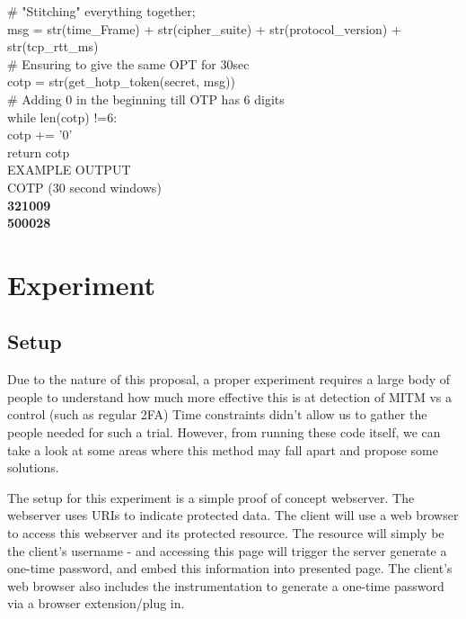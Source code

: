 \documentclass[a4paper, 11pt]{article} 				%
\begin{document}
\# "Stitching" everything together;\\
\indent
msg = str(time\_Frame) + str(cipher\_suite) \indent + str(protocol\_version) + \indent str(tcp\_rtt\_ms)\\

\# Ensuring to give the same OPT for 30sec\\
\indent cotp = str(get\_hotp\_token(secret, msg))\\

\# Adding 0 in the beginning till OTP has 6 digits\\
\indent while len(cotp) !=6:\\
 \indent \indent cotp += '0'\\

\indent \indent return cotp\\

\noindent
EXAMPLE OUTPUT\\
 \noindent
 COTP (30 second windows)\\
 \textbf{321009}\\
 \textbf{500028}\\ 



\section{Experiment}				%
\subsection{Setup}
Due to the nature of this proposal, a proper experiment requires a large body of people to understand how much more effective this is at detection of MITM vs a control (such as regular 2FA) Time constraints didn't allow us to gather the people needed for such a trial. However, from running these code itself, we can take a look at some areas where this method may fall apart and propose some solutions.

The setup for this experiment is a simple proof of concept webserver. The webserver uses URIs to indicate protected data. The client will use a web browser to access this webserver and its protected resource. The resource will simply be the client's username - and accessing this page will trigger the server generate a one-time password, and embed this information into presented page. The client's web browser also includes the instrumentation to generate a one-time password via a browser extension/plug in. 
\end{document}
